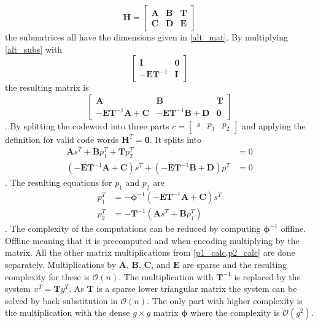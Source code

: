 \begin{equation}
	\bm{H} = \left[\begin{matrix}
		\bm{A} & \bm{B} & \bm{T} \\
		\bm{C} & \bm{D} & \bm{E}
	\end{matrix} \right]
	\label{alt_subs}
\end{equation}
the submatrices all have the dimensions given in \cref{alt_mat}. By multiplying \cref{alt_subs} with
\begin{equation}
	\left[\begin{matrix}
		\bm{I} & \bm{0} \\
		-\bm{E}\bm{T}^{-1} & \bm{I}
	\end{matrix} \right]
\end{equation}
the resulting matrix is
\begin{equation}
	\left[\begin{matrix}
		\bm{A} & \bm{B} & \bm{T} \\
		-\bm{E}\bm{T}^{-1}\bm{A} + \bm{C} & -\bm{E}\bm{T}^{-1}\bm{B} + \bm{D} & \bm{0}
	\end{matrix}\right]
\end{equation}
. By splitting the codeword into three parts $c = \left[\begin{matrix}s & p_1 & p_2\end{matrix}\right]$ and applying the definition for valid code words $\bm{H}^T = \bm{0}$. It splits into
\begin{align}
	\bm{A}s^T + \bm{B}p_1^T + \bm{T}p_2^T & = 0	\\
	\left(-\bm{E}\bm{T}^{-1}\bm{A} + \bm{C}\right)s^T + \left(-\bm{E}\bm{T}^{-1}\bm{B} + \bm{D}\right)p^T & = 0
\end{align}
. The resulting equations for $p_1$ and $p_2$ are
\begin{align}
	p_1^T & = -\bm{\phi}^{-1}\left(-\bm{E}\bm{T}^{-1}\bm{A} + \bm{C}\right)s^T \label{p1_calc}\\
	p_2^T & = -\bm{T}^{-1}\left(\bm{A}s^T + \bm{B}p_1^T\right) \label{p2_calc}
\end{align}
. The complexity of the computations can be reduced by computing $\bm{\phi}^{-1}$ offline. Offline meaning that it is precomputed and when encoding multiplying by the matrix. All the other matrix multiplications from \cref{p1_calc,p2_calc} are done separately. Multiplications by $\bm{A}$, $\bm{B}$, $\bm{C}$, and $\bm{E}$ are sparse and the resulting complexity for these is $\mathcal{O}(n)$. The multiplication with $\bm{T}^{-1}$ is replaced by the system $x^T = \bm{T}y^T$. As $\bm{T}$ is a sparse lower triangular matrix the system can be solved by back substitution in $\mathcal{O}(n)$. The only part with higher complexity is the multiplication with the dense $g\times g$ matrix $\bm{\phi}$ where the complexity is $\mathcal{O}(g^2)$. 

